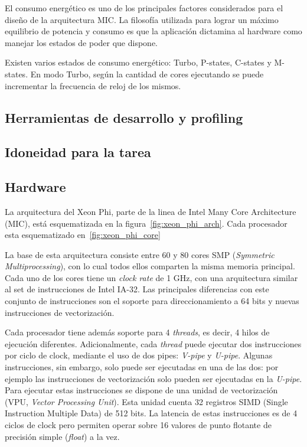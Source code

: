 El consumo energ\'etico es uno de los principales factores considerados para el dise\~no de la arquitectura MIC. La filosof\'ia
utilizada para lograr un m\'aximo equilibrio de potencia y consumo es que la aplicaci\'on dictamina al hardware como 
manejar los estados de poder que dispone. 

Existen varios estados de consumo energ\'etico: Turbo, P-states, C-states y M-states. En modo Turbo, seg\'un la cantidad de
cores ejecutando se puede incrementar la frecuencia de reloj de los mismos.

\subsection{Herramientas de desarrollo y profiling}
\subsection{Idoneidad para la tarea}

\subsection{Hardware}

La arquitectura del Xeon Phi, parte de la linea de Intel Many Core Architecture (MIC), est\'a esquematizada
en la figura~\ref{fig:xeon_phi_arch}. Cada procesador esta esquematizado en~\ref{fig:xeon_phi_core}

La base de esta arquitectura consiste entre 60 y 80 cores SMP (\textit{Symmetric Multiprocessing}), con lo cual todos
ellos comparten la misma memoria principal. Cada uno de los cores tiene un \textit{clock rate} de 1 GHz,
con una arquitectura similar al set de instrucciones de Intel IA-32. Las principales diferencias con este
conjunto de instrucciones son el soporte para direccionamiento a 64 bits y nuevas instrucciones de vectorizaci\'on.

Cada procesador tiene adem\'as soporte para 4 \textit{threads}, es decir, 4 hilos de ejecuci\'on diferentes. Adicionalmente,
cada \textit{thread} puede ejecutar dos instrucciones por ciclo de clock, mediante el uso de dos pipes: \textit{V-pipe} y \textit{U-pipe}.
Algunas instrucciones, sin embargo, solo puede ser ejecutadas en una de las dos: por ejemplo las instrucciones de vectorizaci\'on solo pueden
ser ejecutadas en la \textit{U-pipe}. Para ejecutar estas instrucciones se dispone de una unidad de vectorizaci\'on (VPU, \textit{Vector Processing Unit}).
Esta unidad cuenta 32 registros SIMD (Single Instruction Multiple Data) de 512 bits. La latencia de estas instrucciones es de 4 ciclos de clock pero permiten
operar sobre 16 valores de punto flotante de precisi\'on simple (\textit{float}) a la vez.

